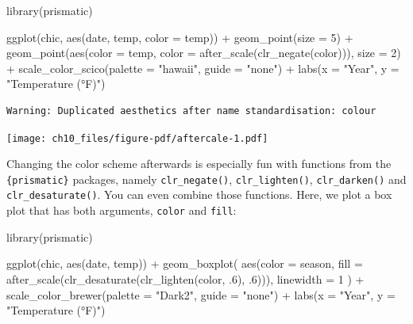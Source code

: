 \documentclass[
  letterpaper,
]{scrbook}
\newenvironment{Shaded}{\begin{snugshade}}{\end{snugshade}}
\newcommand{\AttributeTok}[1]{\textcolor[rgb]{0.40,0.45,0.13}{#1}}
\newcommand{\DecValTok}[1]{\textcolor[rgb]{0.68,0.00,0.00}{#1}}
\newcommand{\FunctionTok}[1]{\textcolor[rgb]{0.28,0.35,0.67}{#1}}
\newcommand{\NormalTok}[1]{\textcolor[rgb]{0.00,0.23,0.31}{#1}}
\newcommand{\SpecialCharTok}[1]{\textcolor[rgb]{0.37,0.37,0.37}{#1}}
\newcommand{\StringTok}[1]{\textcolor[rgb]{0.13,0.47,0.30}{#1}}
\begin{document}
\begin{Shaded}
\begin{Highlighting}[]
\FunctionTok{library}\NormalTok{(prismatic)}

\FunctionTok{ggplot}\NormalTok{(chic, }\FunctionTok{aes}\NormalTok{(date, temp, }\AttributeTok{color =}\NormalTok{ temp)) }\SpecialCharTok{+}
  \FunctionTok{geom\_point}\NormalTok{(}\AttributeTok{size =} \DecValTok{5}\NormalTok{) }\SpecialCharTok{+}
  \FunctionTok{geom\_point}\NormalTok{(}\FunctionTok{aes}\NormalTok{(}\AttributeTok{color =}\NormalTok{ temp,}
                 \AttributeTok{color =} \FunctionTok{after\_scale}\NormalTok{(}\FunctionTok{clr\_negate}\NormalTok{(color))),}
             \AttributeTok{size =} \DecValTok{2}\NormalTok{) }\SpecialCharTok{+}
  \FunctionTok{scale\_color\_scico}\NormalTok{(}\AttributeTok{palette =} \StringTok{"hawaii"}\NormalTok{, }\AttributeTok{guide =} \StringTok{"none"}\NormalTok{) }\SpecialCharTok{+}
  \FunctionTok{labs}\NormalTok{(}\AttributeTok{x =} \StringTok{"Year"}\NormalTok{, }\AttributeTok{y =} \StringTok{"Temperature (°F)"}\NormalTok{)}
\end{Highlighting}
\end{Shaded}

\begin{verbatim}
Warning: Duplicated aesthetics after name standardisation: colour
\end{verbatim}

\texttt{[image: ch10\_files/figure-pdf/aftercale-1.pdf]}

Changing the color scheme afterwards is especially fun with functions
from the \texttt{\{prismatic\}} packages, namely \texttt{clr\_negate()},
\texttt{clr\_lighten()}, \texttt{clr\_darken()} and
\texttt{clr\_desaturate()}. You can even combine those functions. Here,
we plot a box plot that has both arguments, \texttt{color} and
\texttt{fill}:

\begin{Shaded}
\begin{Highlighting}[]
\FunctionTok{library}\NormalTok{(prismatic)}

\FunctionTok{ggplot}\NormalTok{(chic, }\FunctionTok{aes}\NormalTok{(date, temp)) }\SpecialCharTok{+}
  \FunctionTok{geom\_boxplot}\NormalTok{(}
    \FunctionTok{aes}\NormalTok{(}\AttributeTok{color =}\NormalTok{ season,}
        \AttributeTok{fill =} \FunctionTok{after\_scale}\NormalTok{(}\FunctionTok{clr\_desaturate}\NormalTok{(}\FunctionTok{clr\_lighten}\NormalTok{(color, .}\DecValTok{6}\NormalTok{), .}\DecValTok{6}\NormalTok{))),}
    \AttributeTok{linewidth =} \DecValTok{1}
\NormalTok{  ) }\SpecialCharTok{+}
  \FunctionTok{scale\_color\_brewer}\NormalTok{(}\AttributeTok{palette =} \StringTok{"Dark2"}\NormalTok{, }\AttributeTok{guide =} \StringTok{"none"}\NormalTok{) }\SpecialCharTok{+}
  \FunctionTok{labs}\NormalTok{(}\AttributeTok{x =} \StringTok{"Year"}\NormalTok{, }\AttributeTok{y =} \StringTok{"Temperature (°F)"}\NormalTok{)}
\end{Highlighting}
\end{Shaded}
\end{document}
